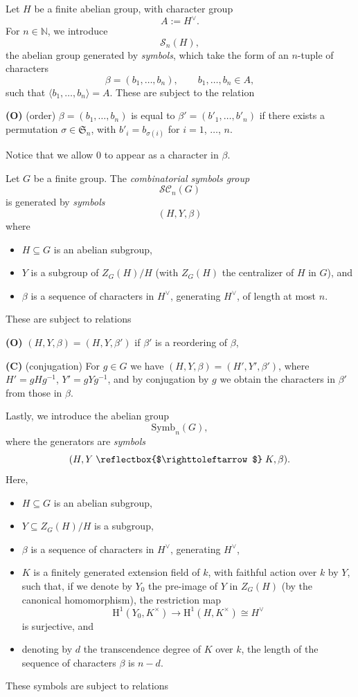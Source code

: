 \documentclass[12pt,reqno]{amsart}
\theoremstyle{plain}
\theoremstyle{remark}
\theoremstyle{definition}
\numberwithin{equation}{section}
\newcommand{\N}{{\mathbb N}}
\newcommand{\cS}{{\mathcal S}}
\newcommand{\rH}{{\mathrm H}}
\newcommand{\fS}{{\mathfrak S}}
\newcommand{\actsfromleft}{\mathrel{\reflectbox{$\righttoleftarrow$}}}
\begin{document}
Let $H$ be a finite abelian group, with character group
\[ A:=H^\vee. \]
For $n\in \N$, we introduce
\[ \cS_n(H), \]
the abelian group generated by \emph{symbols}, which take the form
of an $n$-tuple of characters
\[ \beta=(b_1,\dots,b_n),\qquad b_1,\dots,b_n\in A, \]
such that $\langle b_1,\dots,b_n\rangle=A$.
These are subject to the relation 

\noindent
\textbf{(O)} (order)
$\beta=(b_1,\dots,b_n)$ is equal to $\beta'=(b'_1,\dots,b'_n)$
if there exists a permutation $\sigma\in \fS_n$,
with $b'_i=b_{\sigma(i)}$ for $i=1$, $\dots$, $n$.

Notice that we allow $0$ to appear as a character in $\beta$.

\medskip

Let $G$ be a finite group.
The \emph{combinatorial symbols group}
\[ \mathcal{SC}_n(G) \]
is generated by \emph{symbols}
\[ (H,Y,\beta) \]
where
\begin{itemize}
\item 
$H\subseteq G$ is an abelian subgroup,
\item $Y$ is a subgroup of $Z_G(H)/H$ (with $Z_G(H)$ the centralizer of $H$ in $G$),
and
\item $\beta$ is a sequence of characters in $H^\vee$, generating $H^\vee$, of length at most $n$.
\end{itemize}
These are subject to relations 

\noindent
\textbf{(O)} $(H,Y,\beta)=(H,Y,\beta')$ if $\beta'$ is a reordering of $\beta$, 

\noindent
\textbf{(C)} (conjugation) For $g\in G$ we have $(H,Y,\beta)=(H',Y',\beta')$, where $H'=gHg^{-1}$,
$Y'=gYg^{-1}$, and by conjugation by $g$ we obtain the characters in $\beta'$ from those in $\beta$.

\medskip

Lastly, we introduce the abelian group
\[ \mathrm{Symb}_n(G), \]
where the generators are \emph{symbols}
\[
(H, Y\actsfromleft K, \beta).
\]
Here,
\begin{itemize}
\item $H\subseteq G$ is an abelian subgroup,
\item $Y\subseteq Z_G(H)/H$ is a subgroup,
\item $\beta$ is a sequence of characters in $H^\vee$, generating $H^\vee$,
\item $K$ is a finitely generated extension field of $k$, with faithful action over $k$ by $Y$, such that, if we denote by $Y_0$ the pre-image of $Y$ in $Z_G(H)$ (by the canonical homomorphism), the restriction map
\begin{equation}
\label{eqn:su}
\rH^1(Y_0,K^\times)\to \rH^1(H,K^\times)\cong H^\vee
\end{equation}
is surjective, and
\item denoting by $d$ the transcendence degree of $K$ over $k$,
the length of the sequence of characters $\beta$ is $n-d$.
\end{itemize}
These symbols are subject to relations 
\end{document}
